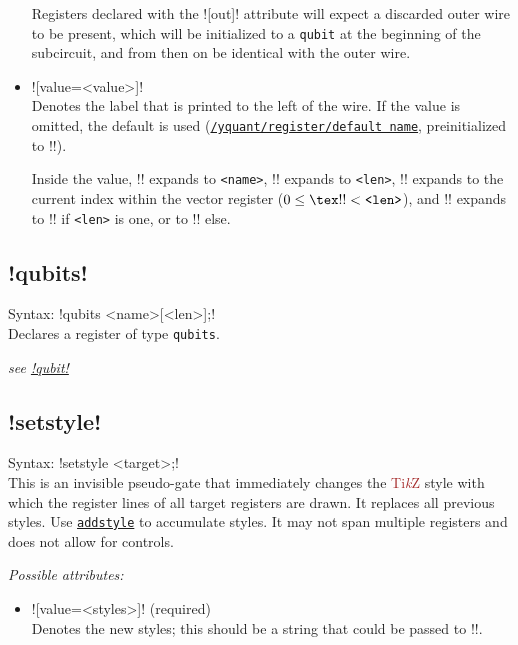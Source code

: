 \documentclass{scrartcl}
\def\TikZ{\textcolor{brown}{Ti\textit kZ}}
\def\gate#1{\hyperref[gate:#1]{\texttt{#1}}}
\def\style#1{\hyperref[style:#1]{\texttt{#1}}}
\begin{document}
\begin{itemize}
               Registers declared with the \yquant![out]! attribute will expect a discarded outer wire to be present, which will be initialized to a \texttt{qubit} at the beginning of the subcircuit, and from then on be identical with the outer wire.
            \item \yquant![value=<value>]! \\
               Denotes the label that is printed to the left of the wire.
               If the value is omitted, the default is used (\style{/yquant/register/default name}, preinitialized to \tex!\regidx!).

               Inside the value, \tex!\reg! expands to \texttt{<name>}, \tex!\len! expands to \texttt{<len>}, \tex!\idx! expands to the current index within the vector register ($0 \leq \text{\tex!\idx!} < \text{\texttt{<len>}}$), and \tex!\regidx! expands to \tex!\reg! if \texttt{<len>} is one, or to \tex!\reg[\idx]! else.
         \end{itemize}

      \subsection{\texorpdfstring{\yquant!qubits!}{qubits}}\label{gate:qubits}
         Syntax: \yquant!qubits <name>[<len>];! \\
         Declares a register of type \texttt{qubits}.

         \emph{see \hyperref[gate:qubit]{\yquant!qubit!}}

      \subsection[\texorpdfstring{\yquant!setstyle!}{setstyle}]{\yquant!setstyle!}\label{gate:setstyle}
         Syntax: \yquant!setstyle <target>;! \\
         This is an invisible pseudo\hyp gate that immediately changes the \TikZ{} style with which the register lines of all target registers are drawn.
         It replaces all previous styles.
         Use \gate{addstyle} to accumulate styles.
         It may not span multiple registers and does not allow for controls.

         \emph{Possible attributes:}
         \begin{itemize}
            \item \yquant![value=<styles>]! (required) \\
               Denotes the new styles; this should be a string that could be passed to \tex!\tikzset!.
         \end{itemize}
\end{document}
